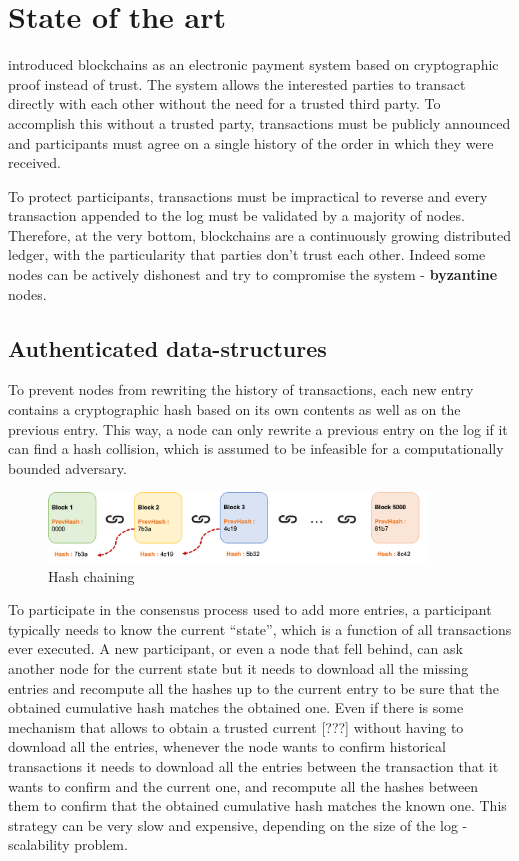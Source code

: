 \chapter{State of the art}
\cite{nakamoto} introduced blockchains as an electronic payment system based on cryptographic proof instead of trust. The system allows the interested parties to transact directly with each other without the need for a trusted third party. To accomplish this without a trusted party, transactions must be publicly announced and participants must agree on a single history of the order in which they were received.

To protect participants, transactions must be impractical to reverse and every transaction appended to the log must be validated by a majority of nodes. Therefore, at the very bottom, blockchains are a continuously growing distributed ledger, with the particularity that parties don't trust each other. Indeed some nodes can be actively dishonest and try to compromise the system - \textbf{byzantine} nodes.

\section{Authenticated data-structures}
To prevent nodes from rewriting the history of transactions, each new entry contains a cryptographic hash based on its own contents as well as on the previous entry. This way, a node can only rewrite a previous entry on the log if it can find a hash collision, which is assumed to be infeasible for a computationally bounded adversary. 

\begin{figure}
\centering
	\includegraphics[width=0.9\textwidth]{img/hashchain.png}
	\caption{Hash chaining}
\end{figure}

To participate in the consensus process used to add more entries, a participant typically needs to know the current “state”, which is a function of all transactions ever executed. A new participant, or even a node that fell behind, can ask another node for the current state but it needs to download all the missing entries and recompute all the hashes up to the current entry to be sure that the obtained cumulative hash matches the obtained one. Even if there is some mechanism that allows to obtain a trusted current [???] without having to download all the entries, whenever the node wants to confirm historical transactions it needs to download all the entries between the transaction that it wants to confirm and the current one, and recompute all the hashes between them to confirm that the obtained cumulative hash matches the known one. 
This strategy can be very slow and expensive, depending on the size of the log - scalability problem.

